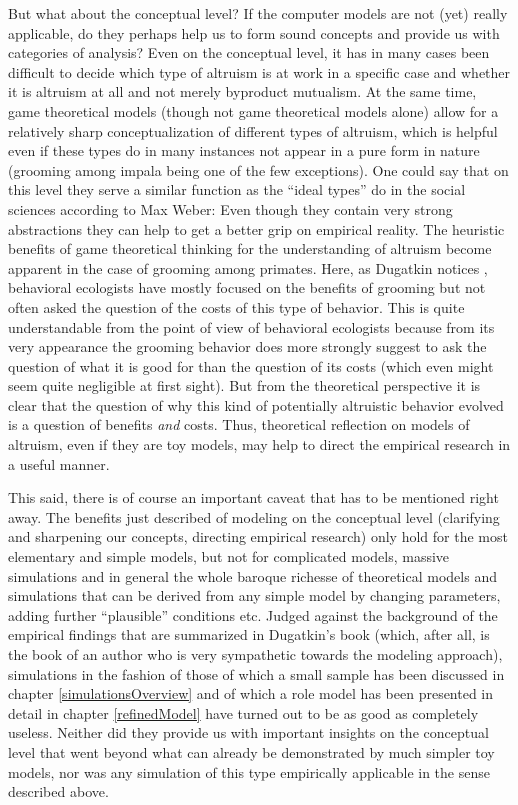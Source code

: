 But what about the conceptual level? If the computer models are not (yet)
really applicable, do they perhaps help us to form sound concepts and provide
us with categories of analysis? Even on the conceptual level, it has in many
cases been difficult to decide which type of altruism is at work in a specific
case and whether it is altruism at all and not merely byproduct mutualism. At
the same time, game theoretical models (though not game theoretical models
alone) allow for a relatively sharp conceptualization of different types of
altruism, which is helpful even if these types do in many instances not appear
in a pure form in nature (grooming among impala being one of the few
exceptions). One could say that on this level they serve a similar function as
the ``ideal types'' do in the social sciences according to Max Weber: Even
though they contain very strong abstractions they can help to get a better
grip on empirical reality. The heuristic benefits of game theoretical thinking
for the understanding of altruism become apparent in the case of grooming
among primates. Here, as Dugatkin notices \cite[p.\ 117]{dugatkin:1997},
behavioral ecologists have mostly focused on the benefits of grooming but not
often asked the question of the costs of this type of behavior. This is quite
understandable from the point of view of behavioral ecologists because from
its very appearance the grooming behavior does more strongly suggest to ask
the question of what it is good for than the question of its costs (which even
might seem quite negligible at first sight). But from the theoretical
perspective it is clear that the question of why this kind of potentially
altruistic behavior evolved is a question of benefits {\em and} costs. Thus,
theoretical reflection on models of altruism, even if they are toy models, may
help to direct the empirical research in a useful manner.

This said, there is of course an important caveat that has to be mentioned
right away. The benefits just described of modeling on the conceptual level
(clarifying and sharpening our concepts, directing empirical research) only
hold for the most elementary and simple models, but not for complicated
models, massive simulations and in general the whole baroque richesse of
theoretical models and simulations that can be derived from any simple model
by changing parameters, adding further ``plausible'' conditions etc. Judged
against the background of the empirical findings that are summarized in
Dugatkin's book (which, after all, is the book of an author who is very
sympathetic towards the modeling approach), simulations in the fashion of
those of which a small sample has been discussed in chapter
\ref{simulationsOverview} and of which a role model has been presented in
detail in chapter \ref{refinedModel} have turned out to be as good as
completely useless. Neither did they provide us with important insights on the
conceptual level that went beyond what can already be demonstrated by much
simpler toy models, nor was any simulation of this type empirically applicable
in the sense described above.

